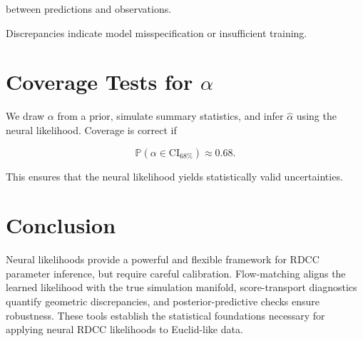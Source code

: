 \documentclass[11pt,a4paper]{article}
\begin{document}
between predictions and observations.

Discrepancies indicate model misspecification or insufficient training.
\section{Coverage Tests for \texorpdfstring{$\alpha$}{alpha}}

We draw $\alpha$ from a prior, simulate summary statistics, and infer 
$\hat{\alpha}$ using the neural likelihood. Coverage is correct if



\[
    \mathbb{P}\!\left(
        \alpha \in \mathrm{CI}_{68\%}
    \right)
    \approx 0.68.
\]



This ensures that the neural likelihood yields statistically valid uncertainties.
\section{Conclusion}

Neural likelihoods provide a powerful and flexible framework for RDCC parameter 
inference, but require careful calibration. Flow-matching aligns the learned 
likelihood with the true simulation manifold, score-transport diagnostics quantify 
geometric discrepancies, and posterior-predictive checks ensure robustness. These 
tools establish the statistical foundations necessary for applying neural RDCC 
likelihoods to Euclid-like data.


\nocite{*}

\end{document}
